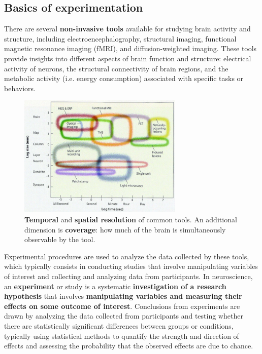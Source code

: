 \subsection{Basics of experimentation}
There are several \textbf{non-invasive tools} available for studying brain activity and structure, including electroencephalography, structural imaging, functional magnetic resonance imaging (fMRI), and diffusion-weighted imaging. These tools provide insights into different aspects of brain function and structure: electrical activity of neurons, the structural connectivity of brain regions, and the metabolic activity (i.e. energy consumption) associated with specific tasks or behaviors.

\begin{figure}[ht]
    \centering
  \captionsetup{width=.8\linewidth}
    \includegraphics[width=0.7\textwidth]{images/tools.png}
    \caption{\textbf{Temporal} and \textbf{spatial resolution} of common tools. An additional dimension is \textbf{coverage}: how much of the brain is simultaneously observable by the tool.}
\end{figure}
Experimental procedures are used to analyze the data collected by these tools, which typically consists in conducting studies that involve manipulating variables of interest and collecting and analyzing data from participants. In neuroscience, an \textbf{experiment} or study is a systematic \textbf{investigation of a research hypothesis} that involves \textbf{manipulating variables and measuring their effects on some outcome of interest}.
Conclusions from experiments are drawn by analyzing the data collected from participants and testing whether there are statistically significant differences between groups or conditions, typically using statistical methods to quantify the strength and direction of effects and assessing the probability that the observed effects are due to chance.\\

